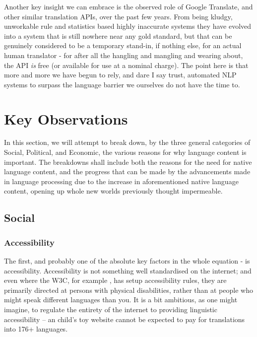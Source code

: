 \documentclass[11pt]{article}
\begin{document}
Another key insight we can embrace is the observed role of Google Translate, and
other similar translation APIs, over the past few years. From being kludgy,
unworkable rule and statistics based highly inaccurate systems they have evolved
into a system that is still nowhere near any gold standard, but that can be
genuinely considered to be a temporary stand-in, if nothing else, for an actual
human translator - for after all the hangling and mangling and wearing about,
the API \textit{is} free (or available for use at a nominal charge). The point
here is that more and more we have begun to rely, and dare I say trust,
automated NLP systems to surpass the language barrier we ourselves do not have
the time to.

\section{Key Observations}

In this section, we will attempt to break down, by the three general categories
of Social, Political, and Economic, the various reasons for why language content
is important. The breakdowns shall include both the reasons for the need for 
native language content, and the progress that can be made by the advancements
made in language processing due to the increase in aforementioned native
language content, opening up whole new worlds previously thought impermeable.

\subsection{Social}

\subsubsection{Accessibility}

The first, and probably one of the absolute key factors in the whole equation -
is accessibility. Accessibility is not something well standardised on the
internet; and even where the W3C, for example \cite{initiative_wai_w3c_nodate},
has setup accessibility rules, they are primarily directed at persons with
physical disabilities, rather than at people who might speak different languages
than you. It is a bit ambitious, as one might imagine, to regulate the entirety
of the internet to providing linguistic accessibility -- an child's toy website
cannot be expected to pay for translations into 176+ languages. 
\end{document}
